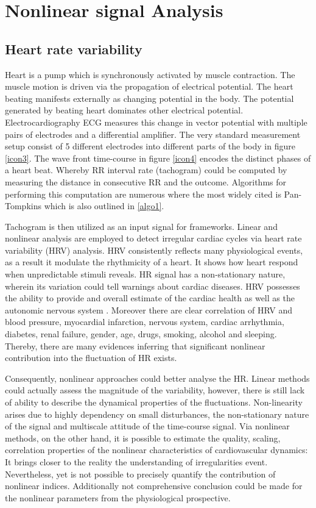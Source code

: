 \section{Nonlinear signal Analysis}

\subsection{Heart rate variability}
Heart is a pump which is synchronously activated by muscle contraction. The muscle motion is driven via the propagation of electrical potential. The heart beating manifests externally as changing potential in the body. The potential generated by beating heart dominates other electrical potential. Electrocardiography ECG measures this change in vector potential with multiple pairs of electrodes and a differential amplifier. The very standard measurement setup consist of 5 different electrodes into different parts of the body in figure \ref{icon3}. The wave front time-course in figure \ref{icon4} encodes the distinct phases of a heart beat. Whereby RR interval rate (tachogram) could be computed by measuring the distance in consecutive RR and the outcome. Algorithms for performing this computation are numerous where the most widely cited is Pan-Tompkins \cite{19} which is also outlined in \ref{algo1}. 

Tachogram is then utilized as an input signal for frameworks. Linear and nonlinear analysis are employed to detect irregular cardiac cycles via heart rate variability (HRV) analysis. HRV consistently reflects many physiological events, as a result it modulate the rhythmicity of a heart. It shows how heart respond when unpredictable stimuli reveals. HR signal has a non-stationary nature, wherein its variation could tell warnings about cardiac diseases. HRV possesses the ability to provide and overall estimate of the cardiac health as well as the autonomic nervous system \cite{20}. Moreover there are clear correlation of HRV and blood pressure, myocardial infarction, nervous system, cardiac arrhythmia, diabetes, renal failure, gender, age, drugs, smoking, alcohol and sleeping. Thereby, there are many evidences inferring that significant nonlinear contribution into the fluctuation of HR exists. 

Consequently, nonlinear approaches could better analyse the HR. Linear methods could actually assess the magnitude of the variability, however, there is still lack of ability to describe the dynamical properties of the fluctuations. Non-linearity arises due to highly dependency on small disturbances, the non-stationary nature of the signal and multiscale attitude of the time-course signal. Via nonlinear methods, on the other hand, it is possible to estimate the quality, scaling, correlation properties of the nonlinear characteristics of cardiovascular dynamics: It brings closer to the reality the understanding of irregularities event. Nevertheless, yet is not possible to precisely quantify the contribution of nonlinear indices. Additionally not comprehensive conclusion could be made for the nonlinear parameters from the physiological prospective. 




